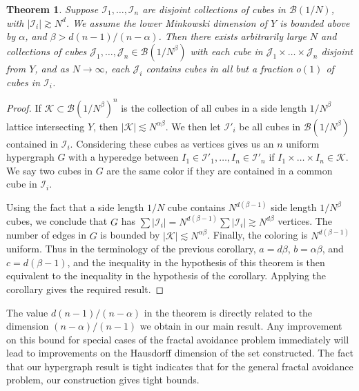 \documentclass{article}
\theoremstyle{plain}
\theoremstyle{plain}
\newtheorem{theorem}{Theorem}
\begin{document}
\begin{multicols}{2}
\begin{theorem}
	Suppose $\mathcal{I}_1, \dots, \mathcal{I}_n$ are disjoint collections of cubes in $\mathcal{B}(1/N)$, with $|\mathcal{I}_i| \gtrsim N^d$. We assume the lower Minkowski dimension of $Y$ is bounded above by $\alpha$, and $\beta > d(n-1)/(n-\alpha)$. Then there exists arbitrarily large $N$ and collections of cubes $\mathcal{J}_1, \dots, \mathcal{J}_n \in \mathcal{B}(1/N^\beta)$ with each cube in $\mathcal{J}_1 \times \dots \times \mathcal{J}_n$ disjoint from $Y$, and as $N \to \infty$, each $\mathcal{J}_i$ contains cubes in all but a fraction $o(1)$ of cubes in $\mathcal{I}_i$.
\end{theorem}
\begin{proof}
	If $\mathcal{K} \subset \mathcal{B}(1/N^\beta)^n$ is the collection of all cubes in a side length $1/N^\beta$ lattice intersecting $Y$, then $|\mathcal{K}| \lesssim N^{\alpha \beta}$. We then let $\mathcal{I}'_i$ be all cubes in $\mathcal{B}(1/N^\beta)$ contained in $\mathcal{I}_i$. Considering these cubes as vertices gives us an $n$ uniform hypergraph $G$ with a hyperedge between $I_1 \in \mathcal{I}'_1, \dots, I_n \in \mathcal{I}'_n$ if $I_1 \times \dots \times I_n \in \mathcal{K}$. We say two cubes in $G$ are the same color if they are contained in a common cube in $\mathcal{I}_i$.

	Using the fact that a side length $1/N$ cube contains $N^{d(\beta - 1)}$ side length $1/N^\beta$ cubes, we conclude that $G$ has $\sum |\mathcal{I}_i| = N^{d(\beta - 1)} \sum |\mathcal{I}_i| \gtrsim N^{d \beta}$ vertices. The number of edges in $G$ is bounded by $|\mathcal{K}| \lesssim N^{\alpha \beta}$. Finally, the coloring is $N^{d(\beta - 1)}$ uniform. Thus in the terminology of the previous corollary, $a = d \beta$, $b = \alpha \beta$, and $c = d(\beta - 1)$, and the inequality in the hypothesis of this theorem is then equivalent to the inequality in the hypothesis of the corollary. Applying the corollary gives the required result.
\end{proof}

The value $d(n-1)/(n-\alpha)$ in the theorem is directly related to the dimension $(n-\alpha)/(n-1)$ we obtain in our main result. Any improvement on this bound for special cases of the fractal avoidance problem immediately will lead to improvements on the Hausdorff dimension of the set constructed. The fact that our hypergraph result is tight indicates that for the general fractal avoidance problem, our construction gives tight bounds.


\end{multicols}
\end{document}
